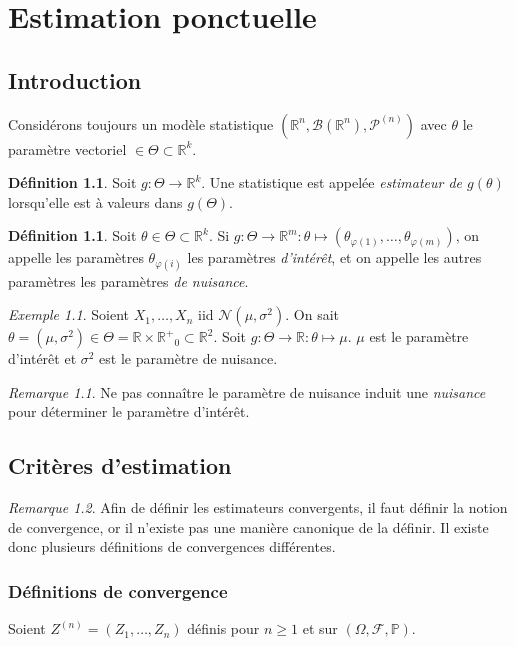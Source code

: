 \documentclass{report}
\renewcommand{\P}{\mathbb P}
\newcommand{\statmod}[4]{\left(#1^{#4}, #2\left(#1^{#4}\right), #3^{\left(#4\right)}\right)}
\newcommand{\probspace}[3]{\left(#1, #2, #3\right)}
\newcommand{\Nms}{\mathcal N(\mu, \sigma^2)}
\newcommand{\R}{\mathbb R}
\newcommand{\Rp}{{\mathbb R^+}}
\newcommand{\Brl}{\mathcal B}  %
\theoremstyle{definition}
\newtheorem{déf}[thm]{Définition}
\theoremstyle{remark}
\newtheorem*{rmq}{Remarque}
\newtheorem{ex}{Exemple}[chapter]
\begin{document}
\chapter{Estimation ponctuelle}
	\section{Introduction}
		Considérons toujours un modèle statistique $\statmod \R\Brl{\mathcal P}n$ avec $\theta$ le paramètre vectoriel $\in \Theta \subset \R^k$.

		\begin{déf} Soit $g : \Theta \to \R^k$. Une statistique est appelée \textit{estimateur de $g(\theta)$} lorsqu'elle est à valeurs dans $g(\Theta)$.
		\end{déf}

		\begin{déf} Soit $\theta \in \Theta \subset \R^k$. Si $g : \Theta \to \R^m : \theta \mapsto (\theta_{\varphi(1)}, \ldots, \theta_{\varphi(m)})$, on
		appelle les paramètres $\theta_{\varphi(i)}$ les paramètres \textit{d'intérêt}, et on appelle les autres paramètres les paramètres \textit{de nuisance}.
		\end{déf}

		\begin{ex} Soient $X_1, \ldots, X_n$ iid $\Nms$. On sait $\theta = (\mu, \sigma^2) \in \Theta = \R \times \Rp_0 \subset \R^2$.
		Soit $g : \Theta \to \R : \theta \mapsto \mu$. $\mu$ est le paramètre d'intérêt et $\sigma^2$ est le paramètre de nuisance.
		\end{ex}

		\begin{rmq} Ne pas connaître le paramètre de nuisance induit une \textit{nuisance} pour déterminer le paramètre d'intérêt.
		\end{rmq}

	\section{Critères d'estimation}
		\begin{rmq} Afin de définir les estimateurs convergents, il faut définir la notion de convergence, or il n'existe pas une manière canonique de la définir.
		Il existe donc plusieurs définitions de convergences différentes.
		\end{rmq}

		\subsection{Définitions de convergence}
			Soient $Z^{(n)} = (Z_1, \ldots, Z_n)$ définis pour $n \geq 1$ et sur $\probspace \Omega{\mathcal F}\P$.
\end{document}
